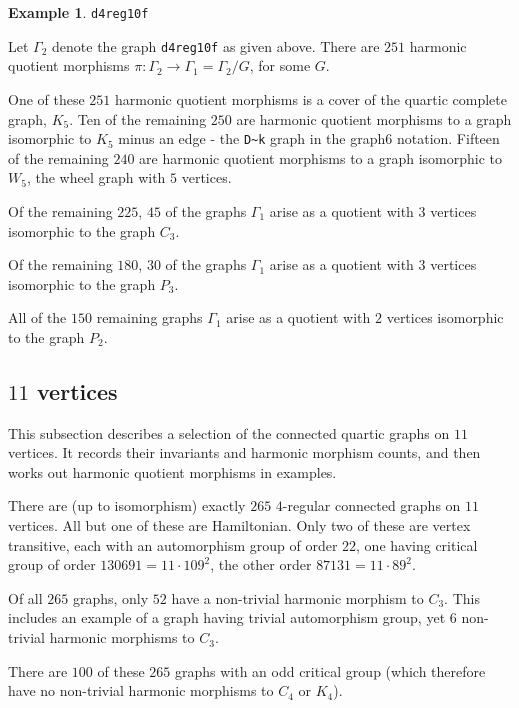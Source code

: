 \documentclass[12pt,letterpaper]{article}
\theoremstyle{definition}
\newtheorem{example}[theorem]{Example}
\begin{document}
\begin{example}%
\label{example:d4reg10f}
 {\tt d4reg10f}\newline
{\rm  
  Let $\Gamma_2$ denote the graph {\tt d4reg10f} as given above.
There are $251$ harmonic quotient morphisms
$\pi: \Gamma_2\to \Gamma_1=\Gamma_2/G$, for some $G$. 

One of these $251$ harmonic quotient morphisms is a
cover of the quartic complete graph, $K_5$.
Ten of the remaining $250$ are harmonic quotient morphisms
to a graph isomorphic to $K_5$ minus an edge - the
\verb+D~k+ graph in the graph6 notation.
Fifteen of the remaining $240$ are harmonic quotient morphisms
to a graph isomorphic to $W_5$, the wheel graph with $5$ vertices.

Of the remaining $225$, $45$ of the graphs $\Gamma_1$ arise as a quotient with
$3$ vertices isomorphic to the graph $C_3$.

Of the remaining $180$, $30$ of the graphs $\Gamma_1$ arise as a quotient with
$3$ vertices isomorphic to the graph $P_3$.

All of the $150$ remaining graphs $\Gamma_1$ arise as a quotient with
$2$ vertices isomorphic to the graph $P_2$.
}
\end{example}


\subsection{\texorpdfstring{$11$}{11} vertices}

This subsection describes a selection of the connected quartic graphs on $11$ vertices.
It records their invariants and harmonic morphism counts, and then
works out harmonic quotient morphisms in examples.


There are (up to isomorphism) exactly $265$ $4$-regular connected graphs on $11$ vertices. All but one of these are Hamiltonian.
Only two of these are vertex transitive, each with an automorphism group of order $22$, one having critical
group of order $130691 = 11\cdot 109^2$, the other order $87131 = 11\cdot 89^2$.

Of all $265$ graphs, only $52$ have a non-trivial harmonic morphism to $C_3$.
This includes an example of a graph having trivial automorphism group, yet $6$ non-trivial harmonic morphisms to $C_3$.

There are $100$ of these $265$ graphs with an odd critical group
(which therefore have no non-trivial harmonic morphisms to $C_4$ or $K_4$).
\end{document}
